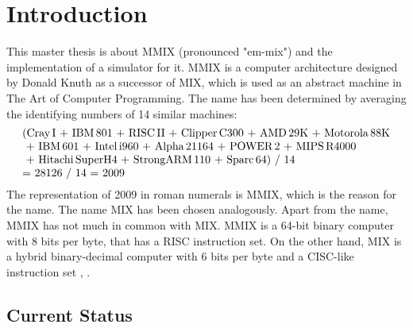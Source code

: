 \chapter{Introduction}

This master thesis is about MMIX (pronounced "em-mix") and the implementation of a simulator for it. MMIX is a computer architecture designed by \gls{Donald Knuth} as a successor of MIX, which is used as an abstract machine in \gls{The Art of Computer Programming}. The name has been determined by averaging the identifying numbers of 14 similar machines:
$$\vbox{\halign{#\hfil\cr
	(\text{Cray\,I}~+~\text{IBM\,801}~+~\text{RISC\,II}~+~\text{Clipper\,C300}~+~\text{AMD\,29K}~+~\text{Motorola\,88K}\cr
	~+~\text{IBM\,601}~+~\text{Intel\,i960}~+~\text{Alpha\,21164}~+~\text{POWER\,2}~+~\text{MIPS\,R4000}\cr
	~+~\text{Hitachi\,SuperH4}~+~\text{StrongARM\,110}~+~\text{Sparc\,64}) / 14\cr
	= 28126 / 14 = 2009\cr
}}$$
The representation of 2009 in roman numerals is MMIX, which is the reason for the name. \citep[pg. 2]{taocpf1} The name MIX has been chosen analogously. Apart from the name, MMIX has not much in common with MIX. MMIX is a 64-bit  binary computer with 8 bits per byte, that has a \gls{RISC} instruction set. On the other hand, MIX is a hybrid binary-decimal computer with 6 bits per byte and a \gls{CISC}-like instruction set \citep{gnumdk}, \citep[pg. 124,125]{taocpv1}.

\section{Current Status}

